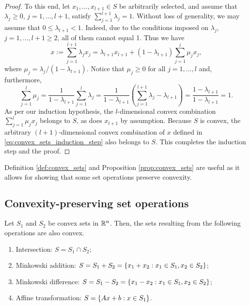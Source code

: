 \begin{proof}
	To this end, let $x_1, \dots, x_{l+1} \in S$ be arbitrarily selected, and assume that $\lambda_j \ge 0$, $j = 1, \dots, l+1$, satisfy $\sum_{j=1}^{l+1}\lambda_j = 1$. Without loss of generality, we may assume that $0 \le \lambda_{l+1} < 1$. Indeed, due to the conditions imposed on $\lambda_j$, $j = 1, \dots, l+1 \ge 2$, all of them cannot equal 1. Thus we have
%	
	\begin{equation}
		x := \sum_{j=1}^{l+1} \lambda_j x_j = \lambda_{l+1}x_{l+1} + (1-\lambda_{l+1})\sum_{j=1}^l \mu_j x_j, \label{eq:convex_sets_induction_step}
	\end{equation}
%
	where $\mu_j = \lambda_j / (1 - \lambda_{l+1})$. Notice that $\mu_j \ge 0$ for all $j = 1, \dots, l$ and, furthermore,
%
	\begin{equation}
		\sum_{j=1}^l \mu_j = \frac{1}{1 - \lambda_{l+1}} \sum_{j=1}^l \lambda_j = \frac{1}{1-\lambda_{l+1}} \left( \sum_{j=1}^{l+1} \lambda_j - \lambda_{l+1} \right) = \frac{1 - \lambda_{l+1}}{1 - \lambda_{l+1}} = 1.
	\end{equation}
%
	As per our induction hypothesis, the $l$-dimensional convex combination $\sum_{j=1}^l\mu_j x_j$ belongs to $S$, as does $x_{l+1}$ by assumption. Because $S$ is convex, the arbitrary $(l+1)$-dimensional convex combination of $x$ defined in \eqref{eq:convex_sets_induction_step} also belongs to $S$. This completes the induction step and the proof.
\end{proof}

Definition \ref{def:convex_sets} and Proposition \ref{prop:convex_sets} are useful as it allows for showing that some set operations preserve convexity. 

\subsection{Convexity-preserving set operations}

\begin{lemma} \label{lem:convex_operations}
	Let $S_1$ and $S_2$ be convex sets in $\mathbb{R}^n$. Then, the sets resulting from the following operations are also convex.
	\begin{enumerate}
		\item {Intersection:} $S = S_1 \cap S_2$;
		\item {Minkowski addition:} $S = S_1 + S_2 = \left\{ x_1 + x_2 : x_1 \in S_1, x_2 \in S_2 \right \}$;
		\item {Minkowski\hspace{-1pt} difference:}\hspace{-2pt} $S = S_1 - S_2 = \left\{ x_1 - x_2 : x_1 \in S_1, x_2 \in S_2 \right \}$;
		\item {Affine transformation:} $S = \left\{ Ax + b : x \in S_1 \right \}$.
	\end{enumerate}
\end{lemma}

